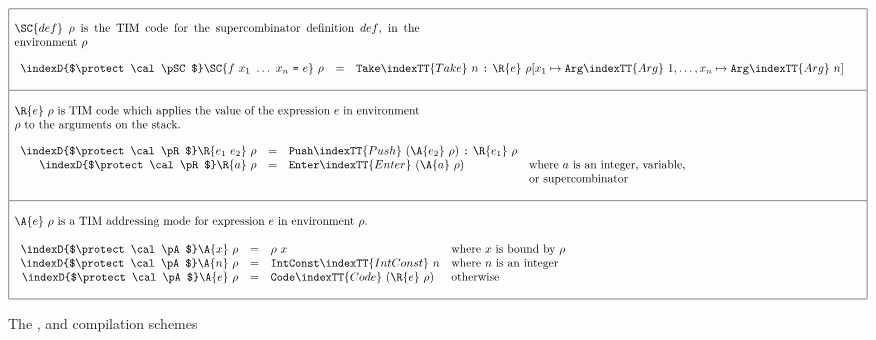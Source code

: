 \begin{figure*}
$\begin{array}{|l|}
\hline
\\
\parbox{29pc}{
$\SC{def}~\rho$ is the TIM code for the supercombinator definition $def$,
in the environment $\rho$}
\\
\\
\begin{array}{rcll}
\indexD{$\protect\cal \pSC$}\SC{f\ x_1\ \ldots\ x_n\ \mbox{\tt =}\ e}~\rho & = & \mbox{\tt Take}\indexTT{Take}\ n\ \mbox{\tt :}\
                \R{e}\ \rho[x_1 \mapsto \mbox{\tt Arg}\indexTT{Arg}~1,\ldots,x_n \mapsto \mbox{\tt Arg}\indexTT{Arg}~n] &
\end{array} \\
\\
\hline
\\
%
\parbox[t]{29pc}{
$\R{e}~\rho$ is TIM code which applies the value of the expression
$e$ in environment $\rho$ to the arguments on the stack.
}
\\
\\
\begin{array}{rcll}
\indexD{$\protect\cal \pR$}\R{e_1~e_2}~\rho & = & \mbox{\tt Push}\indexTT{Push}~(\A{e_2}~\rho)~\mbox{\tt :}~\R{e_1}~\rho & \\
%
\indexD{$\protect\cal \pR$}\R{a}~\rho       & = & \mbox{\tt Enter}\indexTT{Enter}~(\A{a}~\rho) &
                                  \mbox{where $a$ is an integer, variable,} \\
                 &   &          & \mbox{or supercombinator}
\end{array} \\
\\
\hline
\\
\parbox[t]{29pc}{
$\A{e}~\rho$ is a TIM addressing mode for expression $e$
in environment $\rho$.}
\\
\\
\begin{array}{rcll}
\indexD{$\protect\cal \pA$}\A{x}~\rho      & = & \rho~x &
                        \mbox{where $x$ is bound by $\rho$}     \\
%
\indexD{$\protect\cal \pA$}\A{n}~\rho      & = & \mbox{\tt IntConst}\indexTT{IntConst}~ n &
                        \mbox{where $n$ is an integer}  \\
%
\indexD{$\protect\cal \pA$}\A{e}~\rho      & = & \mbox{\tt Code}\indexTT{Code}~(\R{e}~\rho) & \mbox{otherwise}
\end{array} \\
\\
\hline
\end{array}$
\caption{The \tSC{}, \tR{} and \tA{} compilation schemes}
\label{fig:tim:schemes}
\end{figure*}

